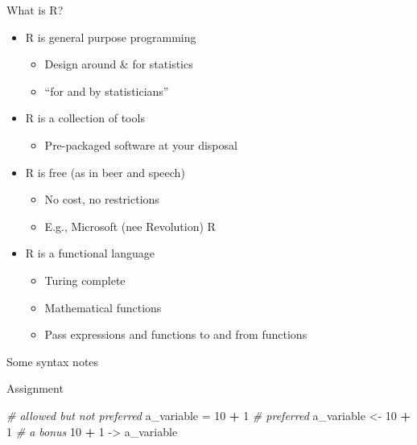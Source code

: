 \documentclass[ignorenonframetext,]{beamer}
\newenvironment{Shaded}{\begin{snugshade}}{\end{snugshade}}
\newcommand{\CommentTok}[1]{\textcolor[rgb]{0.56,0.35,0.01}{\textit{#1}}}
\newcommand{\DecValTok}[1]{\textcolor[rgb]{0.00,0.00,0.81}{#1}}
\newcommand{\NormalTok}[1]{#1}
\newcommand{\OperatorTok}[1]{\textcolor[rgb]{0.81,0.36,0.00}{\textbf{#1}}}
\newcommand{\StringTok}[1]{\textcolor[rgb]{0.31,0.60,0.02}{#1}}
\providecommand{\tightlist}{%
  \setlength{\itemsep}{0pt}\setlength{\parskip}{0pt}}
\begin{document}
\begin{frame}{What is R?}
\protect\hypertarget{what-is-r}{}

\begin{itemize}
\tightlist
\item
  R is general purpose programming

  \begin{itemize}
  \tightlist
  \item
    Design around \& for statistics
  \item
    ``for and by statisticians''
  \end{itemize}
\item
  R is a collection of tools

  \begin{itemize}
  \tightlist
  \item
    Pre-packaged software at your disposal
  \end{itemize}
\item
  R is free (as in beer and speech)

  \begin{itemize}
  \tightlist
  \item
    No cost, no restrictions
  \item
    E.g., Microsoft (nee Revolution) R
  \end{itemize}
\item
  R is a functional language

  \begin{itemize}
  \tightlist
  \item
    Turing complete
  \item
    Mathematical functions
  \item
    Pass expressions and functions to and from functions
  \end{itemize}
\end{itemize}

\end{frame}

\begin{frame}{Some syntax notes}
\protect\hypertarget{some-syntax-notes}{}

\end{frame}

\begin{frame}[fragile]{Assignment}
\protect\hypertarget{assignment}{}

\begin{Shaded}
\begin{Highlighting}[]
\CommentTok{# allowed but not preferred}
\NormalTok{a_variable =}\StringTok{ }\DecValTok{10} \OperatorTok{+}\StringTok{ }\DecValTok{1}
\CommentTok{# preferred}
\NormalTok{a_variable <-}\StringTok{ }\DecValTok{10} \OperatorTok{+}\StringTok{ }\DecValTok{1}
\CommentTok{# a bonus}
\DecValTok{10} \OperatorTok{+}\StringTok{ }\DecValTok{1}\NormalTok{ ->}\StringTok{ }\NormalTok{a_variable}
\end{Highlighting}
\end{Shaded}

\end{frame}
\end{document}
